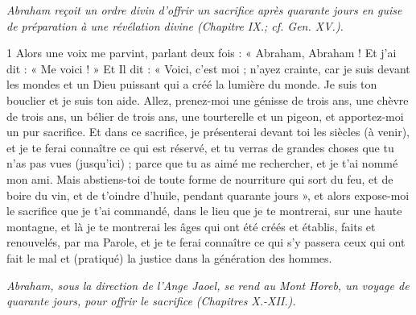 
\par \textit{Abraham reçoit un ordre divin d'offrir un sacrifice après quarante jours en guise de préparation à une révélation divine (Chapitre IX.; cf. Gen. XV.).}

\par 1 Alors une voix me parvint, parlant deux fois : « Abraham, Abraham ! Et j’ai dit : « Me voici ! » Et Il dit : « Voici, c’est moi ; n'ayez crainte, car je suis devant les mondes et un Dieu puissant qui a créé la lumière du monde. Je suis ton bouclier et je suis ton aide. Allez, prenez-moi une génisse de trois ans, une chèvre de trois ans, un bélier de trois ans, une tourterelle et un pigeon, et apportez-moi un pur sacrifice. Et dans ce sacrifice, je présenterai devant toi les siècles (à venir), et je te ferai connaître ce qui est réservé, et tu verras de grandes choses que tu n'as pas vues (jusqu'ici) ; parce que tu as aimé me rechercher, et je t'ai nommé mon ami. Mais abstiens-toi de toute forme de nourriture qui sort du feu, et de boire du vin, et de t'oindre d'huile, pendant quarante jours », et alors expose-moi le sacrifice que je t'ai commandé, dans le lieu que je te montrerai, sur une haute montagne, et là je te montrerai les âges qui ont été créés et établis, faits et renouvelés, par ma Parole, et je te ferai connaître ce qui s'y passera ceux qui ont fait le mal et (pratiqué) la justice dans la génération des hommes.


\par \textit{Abraham, sous la direction de l'Ange Jaoel, se rend au Mont Horeb, un voyage de quarante jours, pour offrir le sacrifice (Chapitres X.-XII.).}

